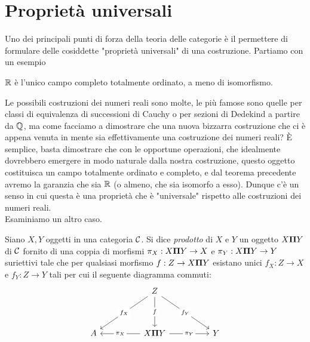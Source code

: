 \documentclass{article}
\begin{document}
\section{Proprietà universali}
\label{sec:Universal}

Uno dei principali punti di forza della teoria delle categorie è il permettere di formulare delle cosiddette "proprietà universali" di una costruzione. Partiamo con un esempio

\begin{theorem}
    $\mathbb{R}$ è l'unico campo completo totalmente ordinato, a meno di isomorfismo. \cite{Huntington1903}
\end{theorem}

Le possibili costruzioni dei numeri reali sono molte, le più famose sono quelle per classi di equivalenza di successioni di Cauchy o per sezioni di Dedekind a partire da $\mathbb{Q}$, ma come facciamo a dimostrare che una nuova bizzarra costruzione che ci è appena venuta in mente sia effettivamente una costruzione dei numeri reali? È semplice, basta dimostrare che con le opportune operazioni, che idealmente dovrebbero emergere in modo naturale dalla nostra costruzione, questo oggetto costituisca un campo totalmente ordinato e completo, e dal teorema precedente avremo la garanzia che sia $\mathbb{R}$ (o almeno, che sia isomorfo a esso). Dunque c'è un senso in cui questa è una proprietà che è "universale" rispetto alle costruzioni dei numeri reali.\\ Esaminiamo un altro caso.

\begin{definition}
    Siano $X,Y$ oggetti in una categoria $\mathcal{C}$. Si dice \emph{prodotto} di $X$ e $Y$ un oggetto $X \mathbf{\Pi} Y$ di $\mathcal{C}$ fornito di una coppia di morfismi $\pi_X: X \mathbf{\Pi} Y \to X$ e $\pi_Y : X \mathbf{\Pi} Y \to Y$ suriettivi tale che per qualsiasi morfismo $f:Z\to X \mathbf{\Pi} Y$ esistano unici $f_X: Z \to X$ e $f_Y : Z\to Y$ tali per cui il seguente diagramma commuti: 
    \[\begin{tikzcd}
	    && Z \\
	    \\
	    A && {X \cattimes Y} && Y
	    \arrow["f"{description}, from=1-3, to=3-3]
	    \arrow["{\pi_X}"{description}, from=3-3, to=3-1]
	    \arrow["{f_X}"{description}, from=1-3, to=3-1]
	    \arrow["{f_Y}"{description}, from=1-3, to=3-5]
	    \arrow["{\pi_Y}"{description}, from=3-3, to=3-5]
    \end{tikzcd}\]
\end{definition}
\end{document}
